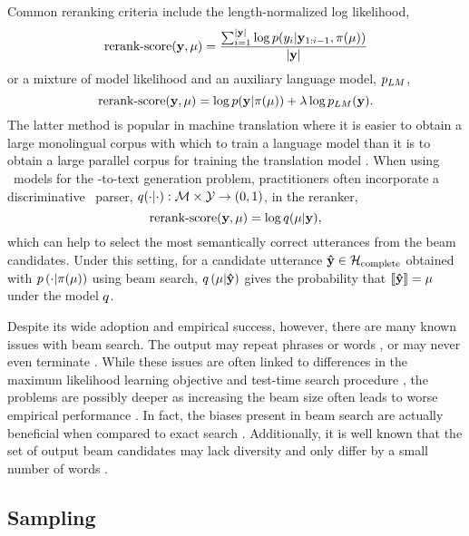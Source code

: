 Common reranking criteria include the length-normalized log likelihood, \[
\operatorname{rerank-score}(\mathbf{y},\mu) = \frac{\sum_{i=1}^{\left\vert \mathbf{y} \right\vert}
\log p(y_i|\mathbf{y}_{1:i-1},\pi(\mu))}{{\left\vert \mathbf{y} \right\vert}}\] or a
mixture of model likelihood and an auxiliary  language model, $p_{LM}$, \[
\operatorname{rerank-score}(\mathbf{y},\mu) = \log p(\mathbf{y}|\pi(\mu)) +
\lambda \log p_{LM}(\mathbf{y}).\] The latter method is popular in machine
translation where it is easier to obtain a large monolingual corpus with which
to train a language model than it is to obtain a large parallel corpus for
training the translation model \citep{xie2017neural}. When using
\sequencetosequence~models for the \meaningrepresentation-to-text generation
problem, practitioners often incorporate a discriminative
\meaningrepresentation~parser, $q(\cdot|\cdot) : \mathcal{M} \times
\mathcal{Y} \rightarrow (0,1)$, in the reranker, \[
\operatorname{rerank-score}(\mathbf{y},\mu) = \log q(\mu|\mathbf{y}),\] which
can help to select the most semantically correct utterances from the beam
candidates. Under this setting, for a candidate utterance $\boldsymbol{\hat{\mathbf{y}}} \in
\mathcal{H}_\textrm{complete}$ obtained with $ p\left( \cdot | \pi (\mu)
\right)$ using beam search, $q\left( \mu | \boldsymbol{\hat{\mathbf{y}}} \right)$ gives
the probability that $\left\llbracket \boldsymbol{\hat{\mathbf{y}}} \right\rrbracket = \mu$ under the model $q$.

Despite its wide adoption and empirical success, however, there are many known
issues with beam search.  The output may repeat phrases or words
\citep{holtzman2019}, or may never even terminate
\citep{welleck2020consistency}.  While these issues are often linked to
differences in the maximum likelihood learning objective and test-time search
procedure \citep{lafferty2001,andor2016}, the problems are possibly deeper as
increasing the beam size often leads to worse empirical performance
\citep{koehn2017}. In fact, the biases present in beam search are actually
beneficial when compared to exact search \citep{stahlberg2019}.  Additionally,
it is well known that the set of output beam candidates may lack diversity and
only differ by a small number of words
\citep{sordoni2015,galley2015,li2016,vinyals2015,serban2016}.

\subsection{Sampling}

